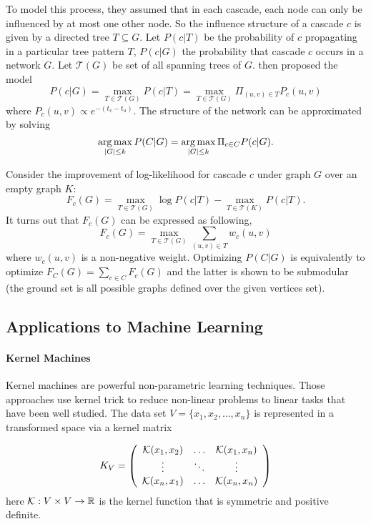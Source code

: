 To model this process, they assumed that in each cascade, each node can only be influenced by at most one other node. So the influence structure of a cascade $c$ is given by a directed tree $T \subseteq G$. Let $P(c|T)$ be the probability of $c$ propagating in a particular tree pattern $T$, $P(c|G)$ the probability that cascade $c$ occurs in a network $G$. Let $\mathcal{T}(G)$ be set of all spanning trees of $G$. \cite{GLK10} then proposed the model 
$$P(c|G) = \max_{T\in\mathcal{T}(G)}P(c|T) = \max_{T\in\mathcal{T}(G)}\Pi_{(u,v)\in T}P_c(u,v)$$
where $P_c(u, v) \propto e^{-(t_v - t_u)}$. The structure of the network can be approximated by solving 
 $$\operatorname*{arg\,max}_{|G|\leq k} P(C|G) = \operatorname*{arg\,max}_{|G|\leq k}\Pi_{c\in C}P(c|G).$$


Consider the improvement of log-likelihood for cascade $c$ under graph $G$ over an empty graph $K$:
$$F_c(G) = \max_{T\in \mathcal{T}(G)}\log P(c|T) - \max_{T\in \mathcal{T}(K)}P(c|T).$$
It turns out that $F_c(G)$ can be expressed as following,
$$F_c(G) = \max_{T\in\mathcal{T}(G)}\sum_{(u, v)\in T}w_c(u, v)$$
where $w_c(u, v)$ is a non-negative weight. Optimizing $P(C|G)$ is equivalently to optimize $F_C(G) = \sum_{c\in C}F_c(G)$ and the latter is shown to be submodular (the ground set is all possible graphs defined over the given vertices set). 






\subsection{Applications to Machine Learning}
\paragraph{Kernel Machines}
Kernel machines \cite{SS02} are powerful non-parametric learning techniques. Those approaches use kernel trick to reduce non-linear problems to linear tasks that have been well studied. The data set $V = \{x_1, x_2, \ldots, x_n\}$ is represented in a transformed space via a kernel matrix

\[ K_V = \left( \begin{array}{ccc}
\mathcal{K}(x_1, x_2) & \ldots & \mathcal{K}(x_1, x_n) \\
\vdots & \ddots & \vdots \\
\mathcal{K}(x_n,x_1) & \ldots & \mathcal{K}(x_n, x_n) \end{array} \right)\] 
here $\mathcal{K}: V\times V \rightarrow \mathbb{R}$ is the kernel function that is symmetric and positive definite. 

